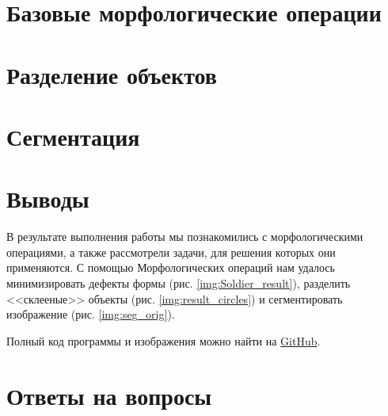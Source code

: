 \section{Базовые морфологические операции}


\newpage
\section{Разделение объектов}


\newpage
\section{Сегментация}


\newpage
\section{Выводы}

В результате выполнения работы мы познакомились с морфологическими операциями, а также рассмотрели задачи, для решения которых они применяются. С помощью Морфологических операций нам удалось минимизировать дефекты формы (рис. \ref{img:Soldier_result}), разделить <<склееные>> объекты (рис. \ref{img:result_circles}) и сегментировать изображение (рис. \ref{img:seg_orig}).

Полный код программы и изображения можно найти на \href{https://github.com/NikBrat/ComputerVision_Lab6}{GitHub}.

\section{Ответы на вопросы}

\setcounter{question}{0}

\newcommand{\question}[1]{\item[Q\refstepcounter{question}\thequestion.] #1}
\newcommand{\answer}[1]{\item[A\thequestion.] #1}



